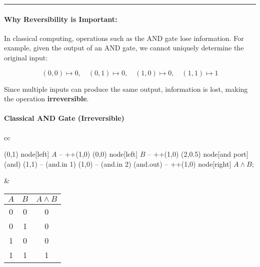 \vspace{0.3cm}

\noindent\rule{\linewidth}{0.2pt}

\vspace{0.3cm}


\paragraph{Why Reversibility is Important:}
In classical computing, operations such as the AND gate lose information.
For example, given the output of an AND gate, we cannot uniquely determine
the original input:

\[
  (0,0) \mapsto 0, \quad (0,1) \mapsto 0, \quad (1,0) \mapsto 0, \quad
  (1,1) \mapsto 1
\]

Since multiple inputs can produce the same output, information is lost,
making the operation \textbf{irreversible}.

\paragraph{Classical AND Gate (Irreversible)}
\begin{center}
  \begin{tabular}{cc}
    \begin{circuitikz} \draw
      (0,1) node[left] {$A$} -- ++(1,0)
      (0,0) node[left] {$B$} -- ++(1,0)
      (2,0.5) node[and port] (and) {}
      (1,1) -- (and.in 1)
      (1,0) -- (and.in 2)
      (and.out) -- ++(1,0) node[right] {$A \land B$};
    \end{circuitikz}
    &
    \begin{tabular}{|c|c|c|}
      \hline
      $A$ & $B$ & $A \land B$ \\
      \hline
      0 & 0 & 0 \\
      0 & 1 & 0 \\
      1 & 0 & 0 \\
      1 & 1 & 1 \\
      \hline
    \end{tabular}
  \end{tabular}
\end{center}

